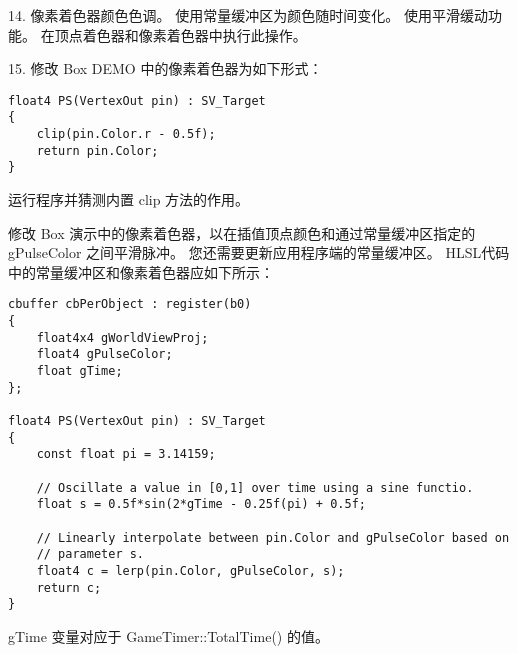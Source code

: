
\begin{flushleft}
14. 像素着色器颜色色调。 使用常量缓冲区为颜色随时间变化。 使用平滑缓动功能。 在顶点着色器和像素着色器中执行此操作。
\end{flushleft}

\begin{flushleft}
15. 修改 Box DEMO 中的像素着色器为如下形式：
\end{flushleft}
\begin{lstlisting}
float4 PS(VertexOut pin) : SV_Target
{
    clip(pin.Color.r - 0.5f);
    return pin.Color;
}
\end{lstlisting}
\begin{flushleft}
运行程序并猜测内置 clip 方法的作用。
\end{flushleft}

\begin{flushleft}
修改 Box 演示中的像素着色器，以在插值顶点颜色和通过常量缓冲区指定的 gPulseColor 之间平滑脉冲。 您还需要更新应用程序端的常量缓冲区。 HLSL代码中的常量缓冲区和像素着色器应如下所示：
\end{flushleft}
\begin{lstlisting}
cbuffer cbPerObject : register(b0)
{
    float4x4 gWorldViewProj;
    float4 gPulseColor;
    float gTime;
};

float4 PS(VertexOut pin) : SV_Target
{
    const float pi = 3.14159;

    // Oscillate a value in [0,1] over time using a sine functio.
    float s = 0.5f*sin(2*gTime - 0.25f(pi) + 0.5f;

    // Linearly interpolate between pin.Color and gPulseColor based on
    // parameter s.
    float4 c = lerp(pin.Color, gPulseColor, s);
    return c;
}
\end{lstlisting}
\begin{flushleft}
gTime 变量对应于 GameTimer::TotalTime() 的值。
\end{flushleft}
